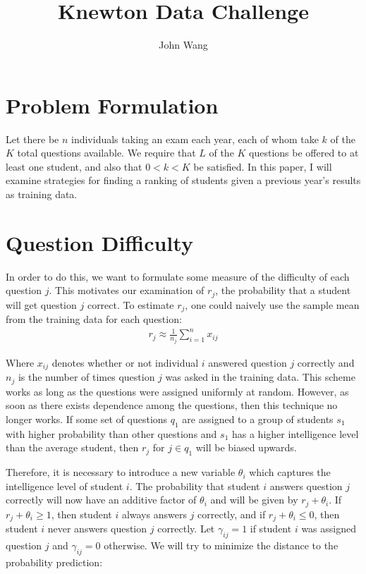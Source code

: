 \documentclass[psamsfonts]{amsart}
\title{Knewton Data Challenge}
\author{John Wang}
\begin{document}
\maketitle

\section{Problem Formulation}

Let there be $n$ individuals taking an exam each year, each of whom take $k$ of the $K$ total questions available. We require that $L$ of the $K$ questions be offered to at least one student, and also that $0 < k < K$ be satisfied. In this paper, I will examine strategies for finding a ranking of students given a previous year's results as training data.

\section{Question Difficulty}

In order to do this, we want to formulate some measure of the difficulty of each question $j$. This motivates our examination of $r_j$, the probability that a student will get question $j$ correct. To estimate $r_j$, one could naively use the sample mean from the training data for each question:
\begin{eqnarray}
r_j \approx \frac{1}{n_j} \sum_{i=1}^n x_{ij}
\end{eqnarray}

Where $x_{ij}$ denotes whether or not individual $i$ answered question $j$ correctly and $n_j$ is the number of times question $j$ was asked in the training data. This scheme works as long as the questions were assigned uniformly at random. However, as soon as there exists dependence among the questions, then this technique no longer works. If some set of questions $q_1$ are assigned to a group of students $s_1$ with higher probability than other questions and $s_1$ has a higher intelligence level than the average student, then $r_j$ for $j \in q_1$ will be biased upwards. 

Therefore, it is necessary to introduce a new variable $\theta_i$ which captures the intelligence level of student $i$. The probability that student $i$ answers question $j$ correctly will now have an additive factor of $\theta_i$ and will be given by $r_j + \theta_i$. If $r_j + \theta_i \geq 1$, then student $i$ always answers $j$ correctly, and if $r_j + \theta_i \leq 0$, then student $i$ never answers question $j$ correctly. Let $\gamma_{ij} = 1$ if student $i$ was assigned question $j$ and $\gamma_{ij} = 0$ otherwise. We will try to minimize the distance to the probability prediction:
\end{document}
